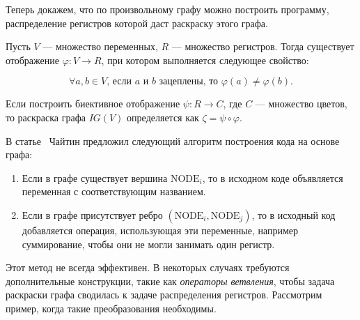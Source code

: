Теперь докажем, что по произвольному графу можно построить программу, распределение регистров которой даст раскраску этого графа.

Пусть $V$ — множество переменных, $R$ — множество регистров.
Тогда существует отображение $\varphi : V \to R$, при котором выполняется следующее свойство:

$$\forall a, b \in V \text{, если } a \text{ и } b \text{ зацеплены, то } \varphi(a) \neq \varphi(b).$$

Если построить биективное отображение $\psi: R \to C$, где $C$ — множество цветов,
то раскраска графа $IG(V)$ определяется как $\zeta = \psi \circ \varphi$.


В статье~\cite{chaitin1982} Чайтин предложил следующий алгоритм построения кода на основе графа:

\begin{enumerate}
    \item Если в графе существует вершина $\text{NODE}_i$, то в исходном коде объявляется переменная с соответствующим
    названием.
    \item Если в графе присутствует ребро $(\text{NODE}_i, \text{NODE}_j)$, то в исходный код добавляется операция,
    использующая эти переменные, например суммирование, чтобы они не могли занимать один регистр.
\end{enumerate}

Этот метод не всегда эффективен. В некоторых случаях требуются дополнительные конструкции, такие как \textit{операторы ветвления},
чтобы задача раскраски графа сводилась к задаче распределения регистров. Рассмотрим пример, когда такие преобразования необходимы.

